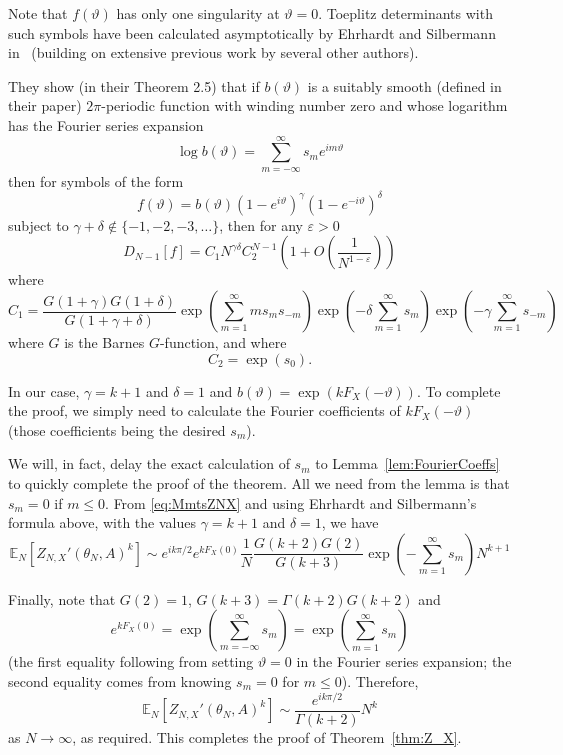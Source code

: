 \documentclass[12pt,a4paper,reqno]{amsart}
\theoremstyle{remark}
\numberwithin{equation}{section}
\newcommand{\ii}{i}
\newcommand{\E}{\mathbb{E}}
\begin{document}
Note that $f(\vartheta)$ has only one singularity at $\vartheta=0$. Toeplitz determinants with such symbols have been calculated asymptotically by Ehrhardt and Silbermann in~\cite{ErhSil97} (building on extensive previous work by several other authors).

They show (in their Theorem 2.5) that if $b(\vartheta)$ is a suitably smooth (defined in their paper) $2\pi$-periodic function with winding number zero and whose logarithm has the Fourier series expansion
\[
\log b(\vartheta) = \sum_{m=-\infty}^\infty s_m e^{\ii m \vartheta}
\]
then for symbols of the form
\[
f(\vartheta) = b(\vartheta) \left(1-e^{\ii \vartheta}\right)^\gamma \left(1-e^{-\ii \vartheta}\right)^\delta
\]
subject to $\gamma+\delta \not\in\{-1,-2,-3,\dots\}$, then for any $\varepsilon>0$
\begin{equation*}
    D_{N-1}[f] = C_1 N^{\gamma \delta} C_2^{N-1} \left(1+ O\left(\frac{1}{N^{1-\varepsilon}}\right) \right)
\end{equation*}
where
\begin{equation*}
C_1 = \frac{G(1+\gamma) G(1+\delta)}{G(1+\gamma+\delta)} \exp\left(\sum_{m=1}^\infty m s_m s_{-m} \right) \exp\left(-\delta \sum_{m=1}^\infty s_m \right)   \exp\left(-\gamma \sum_{m=1}^\infty s_{-m} \right)
\end{equation*}
where $G$ is the Barnes $G$-function, and where
\[
C_2 = \exp(s_0) .
\]


In our case, $\gamma=k+1$ and $\delta=1$ and $b(\vartheta) = \exp(k F_X(-\vartheta))$. To complete the proof, we simply need to calculate the Fourier coefficients of $k F_X(-\vartheta)$ (those coefficients being the desired $s_m$).


We will, in fact, delay the exact calculation of $s_m$ to Lemma~\ref{lem:FourierCoeffs} to quickly complete the proof of the theorem. All we need from the lemma is that $s_m=0$ if $m \leq 0$. From \eqref{eq:MmtsZNX} and using Ehrhardt and Silbermann's formula above, with the values $\gamma=k+1$ and $\delta=1$, we have
\[
\E_{N} \left[ Z_{N,X}'(\theta_N,A)^k \right] \sim  e^{\ii k\pi/2} e^{k F_X(0)} \frac{1}{N} \frac{G(k+2) G(2)}{G(k+3)} \exp\left(-\sum_{m=1}^\infty s_m\right) N^{k+1}
\]

Finally, note that $G(2)=1$, $G(k+3) = \Gamma(k+2) G(k+2)$ and
\[
e^{k F_X(0)} = \exp\left(\sum_{m=-\infty}^\infty s_m \right) = \exp\left(\sum_{m=1}^\infty s_m \right)
\]
(the first equality following from setting $\vartheta=0$ in the Fourier series expansion; the second equality comes from knowing $s_m=0$ for $m\leq 0$). Therefore,
\[
\E_{N} \left[ Z_{N,X}'(\theta_N,A)^k \right] \sim   \frac{e^{\ii k \pi/2}}{\Gamma(k+2)} N^k
\]
as $N\to\infty$, as required. This completes the proof of Theorem~\ref{thm:Z_X}.
\end{document}
